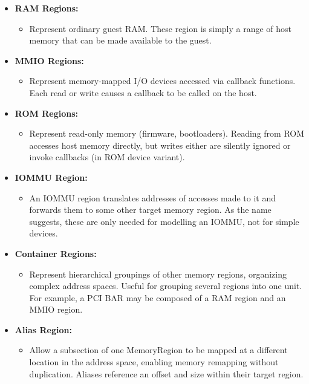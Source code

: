 \begin{itemize}
    \item \textbf{RAM Regions:}
        \begin{itemize}
            \item Represent ordinary guest RAM. These region is simply a range of host memory that can be made available to the guest. 
        \end{itemize}

    \item \textbf{MMIO Regions:}
        \begin{itemize}
            \item Represent memory-mapped I/O devices accessed via callback functions. Each read or write causes a callback to be called on the host.  
        \end{itemize}

    \item \textbf{ROM Regions:}
        \begin{itemize}
            \item Represent read-only memory (firmware, bootloaders). Reading from ROM accesses host memory directly, but writes either are silently ignored or invoke callbacks (in ROM device variant).
        \end{itemize}

    \item \textbf{IOMMU Region:} 
        \begin{itemize}
            \item An IOMMU region translates addresses of accesses made to it and forwards them to some other target memory region. As the name suggests, these are only needed for modelling an IOMMU, not for simple devices. 
        \end{itemize}

    \item \textbf{Container Regions:}
        \begin{itemize}
            \item Represent hierarchical groupings of other memory regions, organizing complex address spaces. Useful for grouping several regions into one unit. For example, a PCI BAR may be composed of a RAM region and an MMIO region.
        \end{itemize}

    \item \textbf{Alias Region:} 
        \begin{itemize}
            \item Allow a subsection of one MemoryRegion to be mapped at a different location in the address space, enabling memory remapping without duplication. Aliases reference an offset and size within their target region.
        \end{itemize}


\end{itemize}

